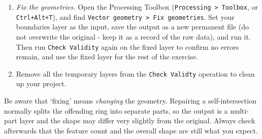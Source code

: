 \documentclass[
  letterpaper,
  DIV=11,
  numbers=noendperiod]{scrreprt}
\begin{document}
\begin{enumerate}
\def\labelenumi{\alph{enumi})}
\setcounter{enumi}{1}
\item
  \emph{Fix the geometries.} Open the Processing Toolbox
  (\texttt{Processing\ \textgreater{}\ Toolbox}, or
  \texttt{Ctrl+Alt+T}), and find
  \texttt{Vector\ geometry\ \textgreater{}\ Fix\ geometries}. Set your
  boundaries layer as the input, save the output as a new permanent file
  (do not overwrite the original - keep it as a record of the raw data),
  and run it. Then run \texttt{Check\ Validity} again on the fixed layer
  to confirm no errors remain, and use the fixed layer for the rest of
  the exercise.
\item
  Remove all the temporary layers from the \texttt{Check\ Validty}
  operation to clean up your project.
\end{enumerate}

Be aware that `fixing' means \emph{changing} the geometry. Repairing a
self-intersection normally splits the offending ring into separate
parts, so the output is a multi-part layer and the shape may differ very
slightly from the original. Always check afterwards that the feature
count and the overall shape are still what you expect.
\end{document}
